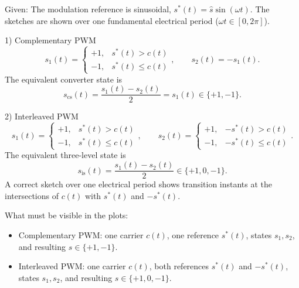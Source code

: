 

\begin{solutionblock}
    Given:
    The modulation reference is sinusoidal, $s^*(t)=\hat{s}\sin(\omega t)$. The sketches are shown over one fundamental electrical period ($\omega t\in[0,2\pi]$).

    1) Complementary PWM
    $$s_1(t)=\begin{cases}
            +1, & s^*(t)>c(t)    \\
            -1, & s^*(t)\le c(t)
        \end{cases},\qquad s_2(t)=-s_1(t).$$
    The equivalent converter state is
    $$s_{\mathrm{cs}}(t)=\frac{s_1(t)-s_2(t)}{2}=s_1(t)\in\{+1,-1\}. $$

    2) Interleaved PWM
    $$s_1(t)=\begin{cases}
            +1, & s^*(t)>c(t)    \\
            -1, & s^*(t)\le c(t)
        \end{cases},\qquad
        s_2(t)=\begin{cases}
            +1, & -s^*(t)>c(t)    \\
            -1, & -s^*(t)\le c(t)
        \end{cases}. $$
    The equivalent three-level state is
    $$s_{\mathrm{is}}(t)=\frac{s_1(t)-s_2(t)}{2}\in\{+1,0,-1\}. $$
    A correct sketch over one electrical period shows transition instants at the intersections of $c(t)$ with $s^*(t)$ and $-s^*(t)$.

    What must be visible in the plots:
    \begin{itemize}
        \item Complementary PWM: one carrier $c(t)$, one reference $s^*(t)$, states $s_1,s_2$, and resulting $s\in\{+1,-1\}$.
        \item Interleaved PWM: one carrier $c(t)$, both references $s^*(t)$ and $-s^*(t)$, states $s_1,s_2$, and resulting $s\in\{+1,0,-1\}$.
    \end{itemize}


\end{solutionblock}
